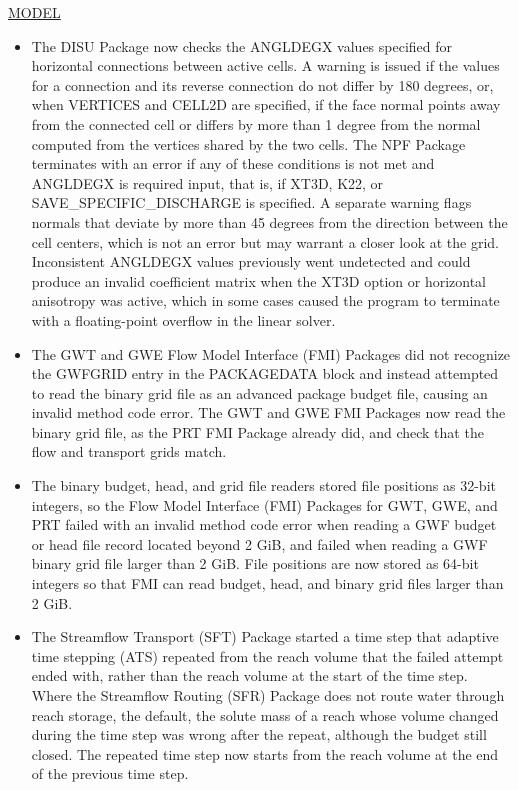 \underline{MODEL}
\begin{itemize}
\item The DISU Package now checks the ANGLDEGX values specified for horizontal connections between active cells. A warning is issued if the values for a connection and its reverse connection do not differ by 180 degrees, or, when VERTICES and CELL2D are specified, if the face normal points away from the connected cell or differs by more than 1 degree from the normal computed from the vertices shared by the two cells. The NPF Package terminates with an error if any of these conditions is not met and ANGLDEGX is required input, that is, if XT3D, K22, or SAVE\_SPECIFIC\_DISCHARGE is specified. A separate warning flags normals that deviate by more than 45 degrees from the direction between the cell centers, which is not an error but may warrant a closer look at the grid. Inconsistent ANGLDEGX values previously went undetected and could produce an invalid coefficient matrix when the XT3D option or horizontal anisotropy was active, which in some cases caused the program to terminate with a floating-point overflow in the linear solver.
\item The GWT and GWE Flow Model Interface (FMI) Packages did not recognize the GWFGRID entry in the PACKAGEDATA block and instead attempted to read the binary grid file as an advanced package budget file, causing an invalid method code error. The GWT and GWE FMI Packages now read the binary grid file, as the PRT FMI Package already did, and check that the flow and transport grids match.
\item The binary budget, head, and grid file readers stored file positions as 32-bit integers, so the Flow Model Interface (FMI) Packages for GWT, GWE, and PRT failed with an invalid method code error when reading a GWF budget or head file record located beyond 2 GiB, and failed when reading a GWF binary grid file larger than 2 GiB. File positions are now stored as 64-bit integers so that FMI can read budget, head, and binary grid files larger than 2 GiB.
\item The Streamflow Transport (SFT) Package started a time step that adaptive time stepping (ATS) repeated from the reach volume that the failed attempt ended with, rather than the reach volume at the start of the time step. Where the Streamflow Routing (SFR) Package does not route water through reach storage, the default, the solute mass of a reach whose volume changed during the time step was wrong after the repeat, although the budget still closed. The repeated time step now starts from the reach volume at the end of the previous time step.
\end{itemize}

